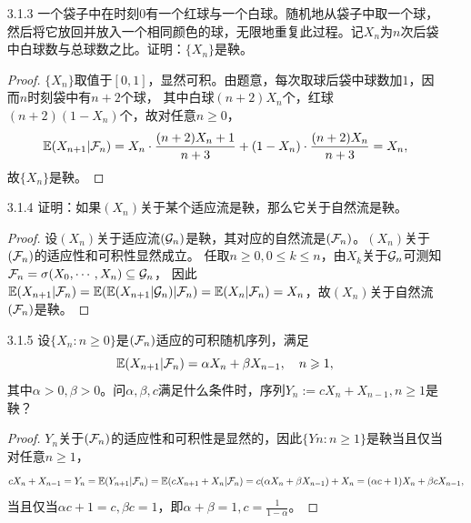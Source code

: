 \begin{enumerate}
\begin{proof}
        (2)由(1)与练习3.1.1(2)知$|X|,|X+Y|$是下鞅，即$\E(|X+Y|||X|)\geqslant\E|X|$，对两侧同时取数学期望即证。
    \end{proof}
    \item[3.1.3] 一个袋子中在时刻$0$有一个红球与一个白球。随机地从袋子中取一个球，
    然后将它放回并放入一个相同颜色的球，无限地重复此过程。记$X_n$为$n$次后袋中白球数与总球数之比。证明：$\{X_n\}$是鞅。
    \begin{proof}
        $\{X_n\}$取值于$[0,1]$，显然可积。由题意，每次取球后袋中球数加$1$，因而$n$时刻袋中有$n+2$个球，
        其中白球$(n+2)X_n$个，红球$(n+2)(1-X_n)$个，故对任意$n\geqslant0$，
        \[\mathbb{E}(X_{n+1}|\mathcal{F}_n)=X_n\cdot\frac{(n+2)X_n+1}{n+3}+(1-X_n)\cdot\frac{(n+2)X_n}{n+3}=X_n,\]
        故$\{X_n\}$是鞅。
    \end{proof}
    \item[3.1.4] 证明：如果$(X_n)$关于某个适应流是鞅，那么它关于自然流是鞅。
    \begin{proof}
        设$(X_n)$关于适应流$(\mathcal{G}_n)$是鞅，其对应的自然流是$(\mathcal{F}_n)$。$(X_n)$关于$(\mathcal{F}_n)$的适应性和可积性显然成立。
        任取$n\geqslant0,0\leqslant k\leqslant n$，由$X_k$关于$\mathcal{G}_n$可测知$\mathcal{F}_n=\sigma(X_0,\cdots,X_n)\subseteq\mathcal{G}_n$，
        因此$\mathbb{E}(X_{n+1}|\mathcal{F}_n)=\mathbb{E}(\mathbb{E}(X_{n+1}|\mathcal{G}_n)|\mathcal{F}_n)=\mathbb{E}(X_n|\mathcal{F}_n)=X_n$，故$(X_n)$关于自然流$(\mathcal{F}_n)$是鞅。
    \end{proof}
    \item[3.1.5] 设$\{X_n:n\geqslant0\}$是$(\mathcal{F}_n)$适应的可积随机序列，满足
    \[\mathbb{E}(X_{n+1}|\mathcal{F}_n)=\alpha X_n+\beta X_{n-1},\quad n\geqslant1,\]
    其中$\alpha>0,\beta>0$。问$\alpha,\beta,c$满足什么条件时，序列$Y_n:=cX_n+X_{n-1},n\geqslant1$是鞅？
    \begin{proof}
        ${Y_n}$关于$(\mathcal{F}_n)$的适应性和可积性是显然的，因此$\{Yn:n\geqslant1\}$是鞅当且仅当对任意$n\geqslant1$，
        \[cX_n+X_{n-1}=Y_n=\mathbb{E}(Y_{n+1}|\mathcal{F}_n)=\mathbb{E}(cX_{n+1}+X_n|\mathcal{F}_n)=c(\alpha X_n+\beta X_{n-1})+X_n=(\alpha c+1)X_n+\beta c X_{n-1},\]
        当且仅当$\alpha c+1=c,\beta c=1$，即$\alpha+\beta=1,c=\frac{1}{1-\alpha}$。
    \end{proof}
\end{enumerate}

